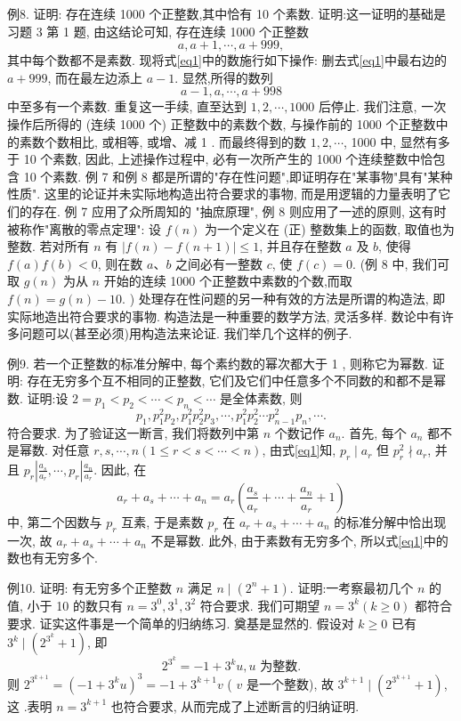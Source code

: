 例8. 证明: 存在连续 1000 个正整数,其中恰有 10 个素数.
证明:这一证明的基础是习题 3 第 1 题, 由这结论可知, 存在连续 1000 个正整数
$$
a, a+1, \cdots, a+999, \label{eq1}
$$
其中每个数都不是素数.
现将式\ref{eq1}中的数施行如下操作: 删去式\ref{eq1}中最右边的 $a+999$, 而在最左边添上 $a-1$. 显然,所得的数列
$$
a-1, a, \cdots, a+998
$$
中至多有一个素数.
重复这一手续, 直至达到 $1,2, \cdots, 1000$ 后停止.
我们注意, 一次操作后所得的 (连续 1000 个) 正整数中的素数个数, 与操作前的 1000 个正整数中的素数个数相比, 或相等, 或增、减 1 . 而最终得到的数 $1,2, \cdots$, 1000 中, 显然有多于 10 个素数, 因此, 上述操作过程中, 必有一次所产生的 1000 个连续整数中恰包含 10 个素数.
例 7 和例 8 都是所谓的"存在性问题",即证明存在"某事物"具有"某种性质". 这里的论证并未实际地构造出符合要求的事物, 而是用逻辑的力量表明了它们的存在.
例 7 应用了众所周知的 "抽庶原理", 例 8 则应用了一述的原则, 这有时被称作"离散的零点定理":
设 $f(n)$ 为一个定义在 (正) 整数集上的函数, 取值也为整数.
若对所有 $n$ 有 $|f(n)-f(n+1)| \leqslant 1$, 并且存在整数 $a$ 及 $b$, 使得 $f(a) f(b)<0$, 则在数 $a 、 b$ 之间必有一整数 $c$, 使 $f(c)=0$. (例 8 中, 我们可取 $g(n)$ 为从 $n$ 开始的连续 1000 个正整数中素数的个数,而取 $f(n)=g(n)-10$. )
处理存在性问题的另一种有效的方法是所谓的构造法, 即实际地造出符合要求的事物.
构造法是一种重要的数学方法, 灵活多样.
数论中有许多问题可以(甚至必须)用构造法来论证.
我们举几个这样的例子.



例9. 若一个正整数的标准分解中, 每个素约数的幂次都大于 1 , 则称它为幂数.
证明: 存在无穷多个互不相同的正整数, 它们及它们中任意多个不同数的和都不是幂数.
证明:设 $2=p_1<p_2<\cdots<p_n<\cdots$ 是全体素数, 则
$$
p_1, p_1^2 p_2, p_1^2 p_2^2 p_3, \cdots, p_1^2 p_2^2 \cdots p_{n-1}^2 p_n, \cdots . \label{eq1}
$$
符合要求.
为了验证这一断言, 我们将数列中第 $n$ 个数记作 $a_n$. 首先, 每个 $a_n$ 都不是幂数.
对任意 $r, s, \cdots, n(1 \leqslant r<s<\cdots<n)$, 由式\ref{eq1}知, $p_r \mid a_r$ 但 $p_r^2 \nmid a_r$, 并且 $p_r\left|\frac{a_s}{a_r}, \cdots, p_r\right| \frac{a_n}{a_r}$. 因此, 在
$$
a_r+a_s+\cdots+a_n=a_r\left(\frac{a_s}{a_r}+\cdots+\frac{a_n}{a_r}+1\right)
$$
中, 第二个因数与 $p_r$ 互素, 于是素数 $p_r$ 在 $a_r+a_s+\cdots+a_n$ 的标准分解中恰出现一次, 故 $a_r+a_s+\cdots+a_n$ 不是幂数.
此外, 由于素数有无穷多个, 所以式\ref{eq1}中的数也有无穷多个.



例10. 证明: 有无穷多个正整数 $n$ 满足 $n \mid\left(2^n+1\right)$.
证明:一考察最初几个 $n$ 的值, 小于 10 的数只有 $n=3^0, 3^1, 3^2$ 符合要求.
我们可期望 $n=3^k(k \geqslant 0)$ 都符合要求.
证实这件事是一个简单的归纳练习.
奠基是显然的.
假设对 $k \geqslant 0$ 已有 $3^k \mid\left(2^{3^k}+1\right)$, 即
$$
2^{3^k}=-1+3^k u, u \text { 为整数.
}
$$
则 $2^{3^{k+1}}=\left(-1+3^k u\right)^3=-1+3^{k+1} v$ ( $v$ 是一个整数), 故 $3^{k+1} \mid\left(2^{3^{k+1}}+1\right)$, 这 .表明 $n=3^{k+1}$ 也符合要求, 从而完成了上述断言的归纳证明.



